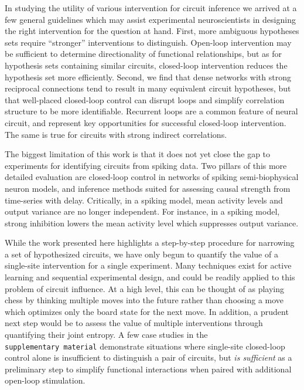 \documentclass{article}
\begin{document}
In studying the utility of various intervention for circuit inference we arrived at a few general guidelines which may assist experimental neuroscientists in designing the right intervention for the question at hand. First, more ambiguous hypotheses sets require ``stronger''
interventions to distinguish. Open-loop intervention may be sufficient to determine directionality of functional relationships, but as for hypothesis sets containing similar circuits, closed-loop intervention reduces the hypothesis set more efficiently. Second, we find that dense networks with strong reciprocal connections tend to result in many equivalent circuit hypotheses, but that well-placed closed-loop control can disrupt loops and simplify correlation structure to be more identifiable. Recurrent loops are a common feature of neural circuit, and represent key opportunities for successful closed-loop intervention. The same is true for circuits with strong indirect correlations.

The biggest limitation of this work is that it does not yet close the gap to experiments for identifying circuits from spiking data. Two pillars of this more detailed evaluation are closed-loop control in networks of spiking semi-biophysical neuron models, and inference methods suited for assessing causal strength from time-series with delay. Critically, in a spiking model, mean activity levels and output variance are no longer independent. For instance, in a spiking model, strong inhibition lowers the mean activity level which suppresses output variance.

While the work presented here highlights a step-by-step procedure for narrowing a set of hypothesized circuits, we have only begun to quantify the value of a single-site intervention for a single experiment. Many techniques exist for active learning and sequential experimental design, and could be readily applied to this problem of circuit influence. At a high level, this can be thought of as playing chess by thinking multiple moves into the future rather than choosing a move which optimizes only the board state for the next move. In addition, a prudent next step would be to assess the value of multiple interventions through quantifying their joint entropy. A few case studies in the
\texttt{supplementary\ material} demonstrate situations where single-site closed-loop control alone is insufficient to distinguish a pair of circuits, but \emph{is sufficient} as a preliminary step to simplify functional interactions when paired with additional open-loop stimulation.
\end{document}
